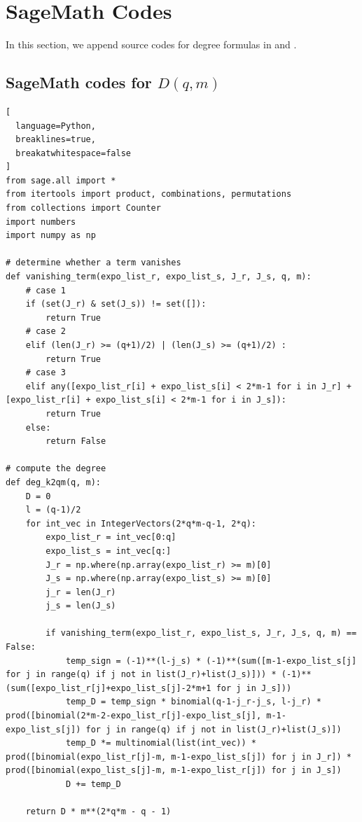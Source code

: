 \documentclass[11pt]{article}
\begin{document}
\section{SageMath Codes}\label{appendix:B}

In this section, we append source codes for degree formulas in  and . 

\subsection{SageMath codes for \texorpdfstring{\(D(q, m)\)}{D(q,m)}}

\begin{lstlisting}[
  language=Python,
  breaklines=true,
  breakatwhitespace=false
]
from sage.all import *
from itertools import product, combinations, permutations
from collections import Counter
import numbers
import numpy as np

# determine whether a term vanishes
def vanishing_term(expo_list_r, expo_list_s, J_r, J_s, q, m):
    # case 1
    if (set(J_r) & set(J_s)) != set([]):
        return True
    # case 2
    elif (len(J_r) >= (q+1)/2) | (len(J_s) >= (q+1)/2) :
        return True
    # case 3
    elif any([expo_list_r[i] + expo_list_s[i] < 2*m-1 for i in J_r] + [expo_list_r[i] + expo_list_s[i] < 2*m-1 for i in J_s]):
        return True
    else:
        return False

# compute the degree
def deg_k2qm(q, m):
    D = 0
    l = (q-1)/2
    for int_vec in IntegerVectors(2*q*m-q-1, 2*q):
        expo_list_r = int_vec[0:q]
        expo_list_s = int_vec[q:]
        J_r = np.where(np.array(expo_list_r) >= m)[0]
        J_s = np.where(np.array(expo_list_s) >= m)[0]
        j_r = len(J_r)
        j_s = len(J_s)
        
        if vanishing_term(expo_list_r, expo_list_s, J_r, J_s, q, m) == False:
            temp_sign = (-1)**(l-j_s) * (-1)**(sum([m-1-expo_list_s[j] for j in range(q) if j not in list(J_r)+list(J_s)])) * (-1)**(sum([expo_list_r[j]+expo_list_s[j]-2*m+1 for j in J_s]))
            temp_D = temp_sign * binomial(q-1-j_r-j_s, l-j_r) * prod([binomial(2*m-2-expo_list_r[j]-expo_list_s[j], m-1-expo_list_s[j]) for j in range(q) if j not in list(J_r)+list(J_s)])
            temp_D *= multinomial(list(int_vec)) * prod([binomial(expo_list_r[j]-m, m-1-expo_list_s[j]) for j in J_r]) * prod([binomial(expo_list_s[j]-m, m-1-expo_list_r[j]) for j in J_s])
            D += temp_D
    
    return D * m**(2*q*m - q - 1)
\end{lstlisting}
\end{document}
